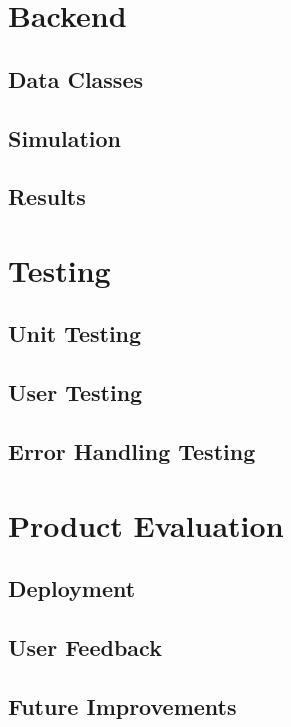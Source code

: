 \documentclass{article}
\begin{document}
\section{Backend}

    \subsection{Data Classes}

    \subsection{Simulation}

    \subsection{Results}

\section{Testing}

    \subsection{Unit Testing}

    \subsection{User Testing}

    \subsection{Error Handling Testing}

\section{Product Evaluation}

    \subsection{Deployment}

    \subsection{User Feedback}

    \subsection{Future Improvements}
\end{document}
